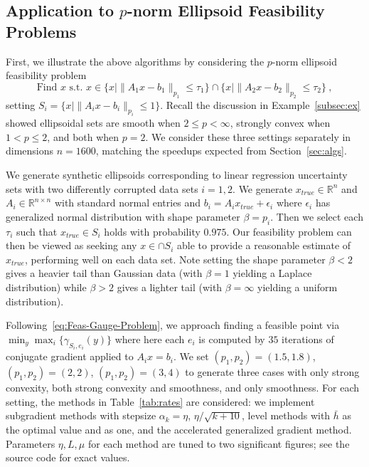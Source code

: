 \documentclass[sn-mathphys,Numbered]{sn-jnl}%
\begin{document}
\subsection{Application to \texorpdfstring{$p$}{Lg}-norm Ellipsoid Feasibility Problems}\label{subsec:numerics1}

First, we illustrate the above algorithms by considering the $p$-norm ellipsoid feasibility problem
\begin{equation}
    \text{Find } x \text{ s.t. } x\in \{x \mid \|A_1x-b_1\|_{p_1}\leq \tau_1 \}\cap \{x \mid \|A_2x-b_2\|_{p_2}\leq \tau_2 \} \ ,
\end{equation}
setting $S_i=\{x \mid \|A_ix - b_i\|_{p_i}\leq 1\}$. Recall the discussion in Example~\ref{subsec:ex} showed ellipsoidal sets are smooth when $2\leq p < \infty$, strongly convex when $1<p\leq 2$, and both when $p=2$. We consider these three settings separately in dimensions $n=1600$, matching the speedups expected from Section~\ref{sec:algs}.

We generate synthetic ellipsoids corresponding to linear regression uncertainty sets with two differently corrupted data sets $i=1,2$. We generate $x_{true}\in\mathbb{R}^n$ and $A_i\in\mathbb{R}^{n\times n}$ with standard normal entries and $b_i = A_ix_{true} + \epsilon_i$ where $\epsilon_i$ has generalized normal distribution with shape parameter $\beta = p_i$. Then we select each $\tau_i$ such that $x_{true}\in S_i$ holds with probability $0.975$. Our feasibility problem can then be viewed as seeking any $x\in \cap S_i$ able to provide a reasonable estimate of $x_{true}$, performing well on each data set. Note setting the shape parameter $\beta<2$ gives a heavier tail than Gaussian data (with $\beta=1$ yielding a Laplace distribution) while $\beta>2$ gives a lighter tail (with $\beta=\infty$ yielding a uniform distribution).

Following~\eqref{eq:Feas-Gauge-Problem}, we approach finding a feasible point via $\min_y \max_i\{\gamma_{S_i,e_i}(y)\}$
where here each $e_i$ is computed by $35$ iterations of conjugate gradient applied to $A_ix=b_i$.  
We set $(p_1,p_2)=(1.5,1.8)$, $(p_1,p_2)=(2,2)$, $(p_1,p_2)=(3,4)$ to generate three cases with only strong convexity, both strong convexity and smoothness, and only smoothness. For each setting, the methods in Table~\ref{tab:rates} are considered: we implement subgradient methods with stepsize $\alpha_k = \eta$, $\eta/\sqrt{k+10}$, level methods with $\bar h$ as the optimal value and as one, and the accelerated generalized gradient method. Parameters $\eta,L,\mu$ for each method are tuned to two significant figures; see the source code for exact values.
\end{document}
